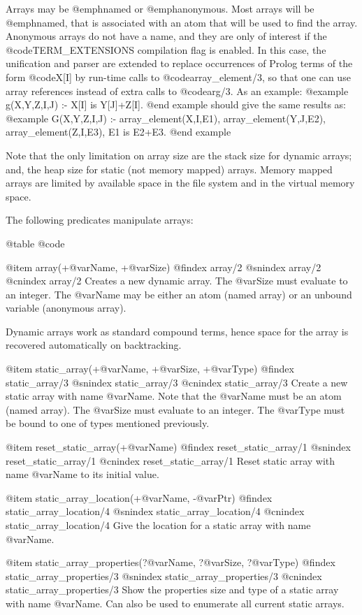{{{{{{Arrays may be @emph{named} or @emph{anonymous}. Most arrays will be
@emph{named}, that is associated with an atom that will be used to find
the array. Anonymous arrays do not have a name, and they are only of
interest if the @code{TERM_EXTENSIONS} compilation flag is enabled. In
this case, the unification and parser are extended to replace
occurrences of Prolog terms of the form @code{X[I]} by run-time calls to
@code{array_element/3}, so that one can use array references instead of
extra calls to @code{arg/3}. As an example:
@example
g(X,Y,Z,I,J) :- X[I] is Y[J]+Z[I].
@end example
should give the same results as:
@example
G(X,Y,Z,I,J) :-
        array_element(X,I,E1),
        array_element(Y,J,E2),  
        array_element(Z,I,E3),  
        E1 is E2+E3.
@end example

Note that the only limitation on array size are the stack size for
dynamic arrays; and, the heap size for static (not memory mapped)
arrays. Memory mapped arrays are limited by available space in the file
system and in the virtual memory space.

The following predicates manipulate arrays:

@table @code

@item array(+@var{Name}, +@var{Size})
@findex array/2
@snindex array/2
@cnindex array/2
Creates a new dynamic array. The @var{Size} must evaluate to an
integer. The @var{Name} may be either an atom (named array) or an
unbound variable (anonymous array).

Dynamic arrays work as standard compound terms, hence space for the
array is recovered automatically on backtracking.

@item static_array(+@var{Name}, +@var{Size}, +@var{Type})
@findex static_array/3
@snindex static_array/3
@cnindex static_array/3
Create a new static array with name @var{Name}. Note that the @var{Name}
must be an atom (named array). The @var{Size} must evaluate to an
integer.  The @var{Type} must be bound to one of types mentioned
previously.

@item reset_static_array(+@var{Name})
@findex reset_static_array/1
@snindex reset_static_array/1
@cnindex reset_static_array/1
Reset static array with name @var{Name} to its initial value.

@item static_array_location(+@var{Name}, -@var{Ptr})
@findex static_array_location/4
@snindex static_array_location/4
@cnindex static_array_location/4
Give the location for  a static array with name
@var{Name}.

@item static_array_properties(?@var{Name}, ?@var{Size}, ?@var{Type})
@findex static_array_properties/3
@snindex static_array_properties/3
@cnindex static_array_properties/3
Show the properties size and type of a static array with name
@var{Name}. Can also be used to enumerate all current
static arrays. 

}}}}}}
